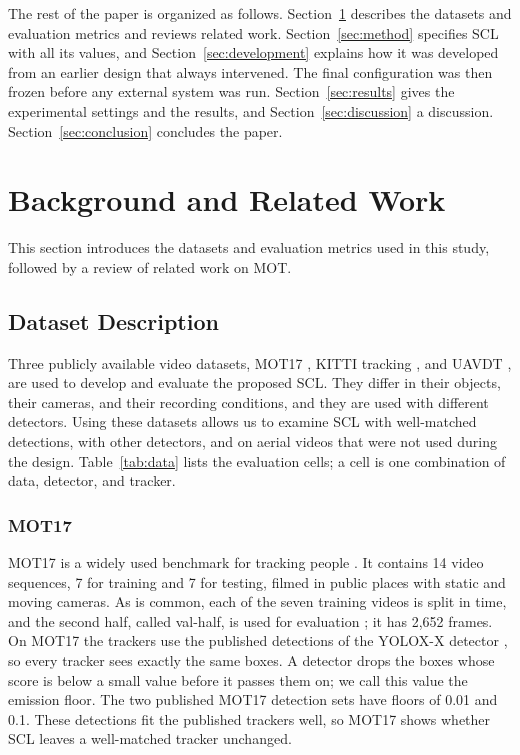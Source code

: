 \documentclass[pdflatex,sn-mathphys-num,iicol]{sn-jnl}
\newcommand{\scl}{SCL}
\begin{document}
The rest of the paper is organized as follows. Section~\ref{sec:related} describes the datasets and
evaluation metrics and reviews related work. Section~\ref{sec:method} specifies \scl{} with all its
values, and Section~\ref{sec:development} explains how it was developed from an earlier design that
always intervened. The final configuration was then frozen before any external system was run.
Section~\ref{sec:results} gives the experimental settings and the results, and
Section~\ref{sec:discussion} a discussion. Section~\ref{sec:conclusion} concludes the paper.
\section{Background and Related Work}\label{sec:related}
This section introduces the datasets and evaluation metrics used in this study, followed by a
review of related work on MOT.

\subsection{Dataset Description}\label{sec:data}
Three publicly available video datasets, MOT17 \cite{milan2016mot16}, KITTI tracking
\cite{geiger2012kitti}, and UAVDT \cite{du2018uavdt}, are used to develop and evaluate the
proposed \scl{}. They differ in their objects, their cameras, and their recording conditions, and
they are used with different detectors. Using these datasets allows us to examine \scl{} with
well-matched detections, with other detectors, and on aerial videos that were not used during the
design. Table~\ref{tab:data} lists the evaluation cells; a cell is one combination of data,
detector, and tracker.

\subsubsection{MOT17}
MOT17 is a widely used benchmark for tracking people \cite{milan2016mot16}. It contains 14 video
sequences, 7 for training and 7 for testing, filmed in public places with static and moving
cameras. As is common, each of the seven training videos is split in time, and the second half,
called val-half, is used for evaluation \cite{zhang2022bytetrack}; it has 2,652 frames. On MOT17
the trackers use the published detections of the YOLOX-X detector \cite{ge2021yolox}, so every
tracker sees exactly the same boxes. A detector drops the boxes whose score is below a small value
before it passes them on; we call this value the emission floor. The two published MOT17 detection
sets have floors of 0.01 and 0.1. These detections fit the published trackers well, so MOT17 shows
whether \scl{} leaves a well-matched tracker unchanged.
\end{document}
